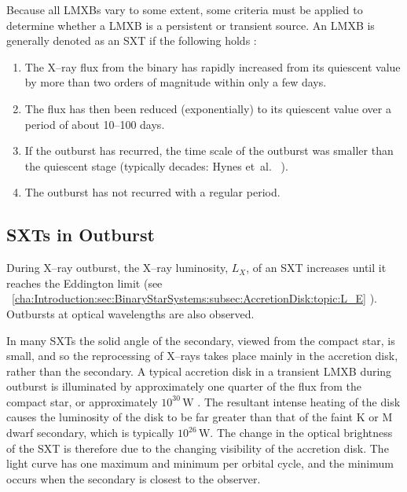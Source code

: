 Because all LMXBs vary to some extent, some criteria must be applied to determine whether a LMXB is a persistent or transient source. An LMXB is generally denoted as an SXT if the following holds %
\cite{TanakaShibazaki:1996}:
\begin{enumerate}
\item
\label{cha:Introduction:sec:X--rayBinaries:subsec:CriteriaForSXTs:enu:flux}
The X--ray flux from the binary has rapidly increased from its quiescent
value by more than two orders of magnitude within only a few days.
\item
\label{cha:Introduction:sec:X--rayBinaries:subsec:CriteriaForSXTs:enu:reduction}
The flux has then been reduced (exponentially) to its quiescent value
over a period of about 10--100 days.
\item
\label{cha:Introduction:sec:X--rayBinaries:subsec:CriteriaForSXTs:enu:outburst}
If the outburst has recurred, the time scale of the outburst was
smaller than the quiescent stage (typically decades: Hynes et~al.\ %
). %
\item
\label{cha:Introduction:sec:X--rayBinaries:subsec:CriteriaForSXTs:enu:recur}
The outburst has not recurred with a regular period.
\end{enumerate}


\subsection{SXTs in Outburst}
\label{cha:Introduction:sec:X--rayBinaries:subsec:Outburst}

During X--ray outburst, the X--ray luminosity, $L_X$, of an SXT increases until it reaches
the Eddington limit (see%
\ \vref{cha:Introduction:sec:BinaryStarSystems:subsec:AccretionDisk:topic:L_E}%
). Outbursts at optical wavelengths are also observed.%

\vspace{\myparskip}

In many SXTs the solid angle of the secondary, viewed from the compact star, is small, and so the reprocessing
of X--rays takes place mainly in the accretion disk, rather than the secondary. A typical accretion disk in a transient LMXB during outburst is illuminated by approximately one quarter of the
flux from the compact star, or approximately
$10^{30}\,\mathrm{W}$ %
\cite{VanParadijsMcClintock:1995}. %
The resultant intense heating of the disk causes the luminosity of the
disk to be far greater than that of the faint K or M dwarf secondary,
which is typically $10^{26}\,\mathrm{W}$. %
The change in the optical brightness of the SXT is therefore due to the changing
visibility of the accretion disk. The light curve has one maximum and minimum per orbital
cycle, and the minimum occurs when the secondary is closest to the
observer. %

